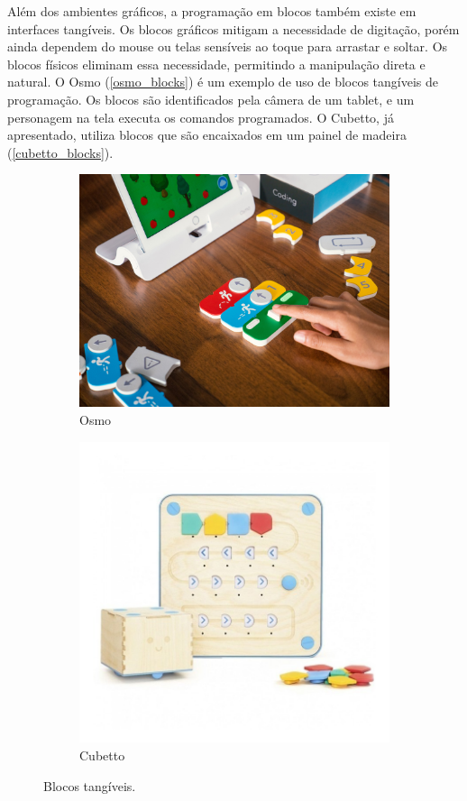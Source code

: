 Além dos ambientes gráficos, a programação em blocos também existe em interfaces tangíveis. Os blocos gráficos mitigam a necessidade de digitação, porém ainda dependem do mouse ou telas sensíveis ao toque para arrastar e soltar. Os blocos físicos eliminam essa necessidade, permitindo a manipulação direta e natural. O Osmo (\autoref{osmo_blocks}) é um exemplo de uso de blocos tangíveis de programação. Os blocos são identificados pela câmera de um tablet, e um personagem na tela executa os comandos programados. O Cubetto, já apresentado, utiliza blocos que são encaixados em um painel de madeira (\autoref{cubetto_blocks}).

\begin{figure}[!htbp]
    \centering
    \begin{subfigure}{.56\textwidth}
        \centering
        \includegraphics[width=.9\linewidth,fbox]{figs/osmo.jpg}
        \caption{Osmo}
        \label{osmo_blocks}
    \end{subfigure}%
    \begin{subfigure}{.43\textwidth}
        \centering
        \includegraphics[width=.9\linewidth,fbox]{figs/cubetto.jpg}
        \caption{Cubetto}
        \label{cubetto_blocks}
    \end{subfigure}
    \caption{Blocos tangíveis.}
    \sourceauthor
    \label{tangible_blocks}
\end{figure}

